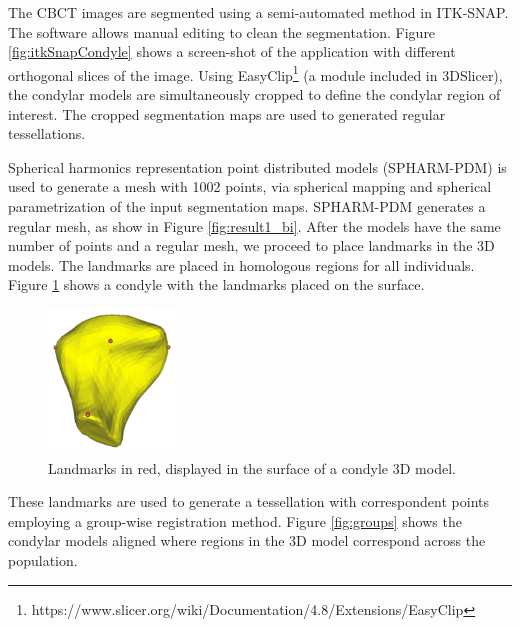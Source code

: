 \documentclass[]{spie}  %
\begin{document}
The CBCT images are segmented using a semi-automated method in ITK-SNAP\cite{py06nimg}. The software allows manual editing to clean the segmentation. Figure \ref{fig:itkSnapCondyle} shows a screen-shot of the application with different orthogonal slices
of the image.
Using EasyClip\footnote{https://www.slicer.org/wiki/Documentation/4.8/Extensions/EasyClip} (a module included in 3DSlicer), the condylar models are simultaneously cropped to define the condylar region of interest. The cropped segmentation maps are used to generated regular tessellations.


Spherical harmonics representation point distributed models (SPHARM-PDM)\cite{styner2006framework} is used to generate a mesh with 1002 points, via spherical mapping and spherical parametrization of the input segmentation maps. 
SPHARM-PDM generates a regular mesh, as show in Figure \ref{fig:result1_bi}.
After the models have the same number of points and a regular mesh, we proceed to place landmarks in the 3D models. 
The landmarks are placed in homologous regions for all individuals. Figure \ref{fig:registration} shows a condyle 
with the landmarks placed on the surface. 
\begin{figure}
    \centering
    \includegraphics[width=0.3\textwidth]{LandmarksCondyle.png}
    \caption{Landmarks in red, displayed in the surface of a condyle 3D model.}
    \label{fig:registration}
\end{figure}
These landmarks are used to generate a tessellation with correspondent points 
employing a group-wise registration method\cite{lyu2013group}.
Figure \ref{fig:groups} shows the condylar models aligned where regions in the 3D model correspond across the population.
\end{document}
